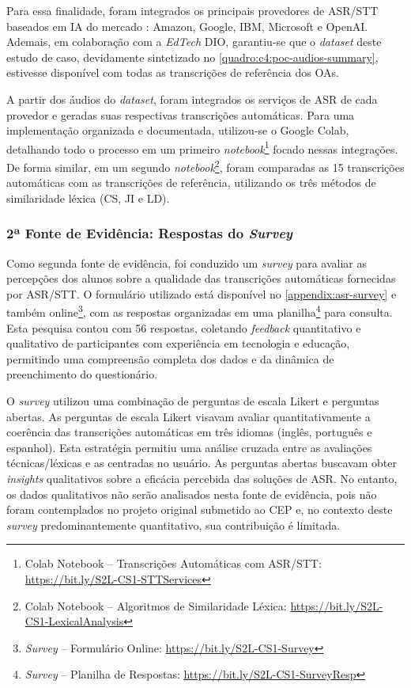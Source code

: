 Para essa finalidade, foram integrados os principais provedores de ASR/STT baseados em IA do mercado \cite{Gartner2023}: Amazon, Google, IBM, Microsoft e OpenAI. Ademais, em colaboração com a \textit{EdTech} DIO, garantiu-se que o \textit{dataset} deste estudo de caso, devidamente sintetizado no \autoref{quadro:c4:poc-audios-summary}, estivesse disponível com todas as transcrições de referência dos OAs.

A partir dos áudios do \textit{dataset}, foram integrados os serviços de ASR de cada provedor e geradas suas respectivas transcrições automáticas. Para uma implementação organizada e documentada, utilizou-se o Google Colab, detalhando todo o processo em um primeiro \textit{notebook}\footnote{Colab Notebook -- Transcrições Automáticas com ASR/STT: \url{https://bit.ly/S2L-CS1-STTServices}} focado nessas integrações. De forma similar, em um segundo \textit{notebook}\footnote{Colab Notebook -- Algoritmos de Similaridade Léxica: \url{https://bit.ly/S2L-CS1-LexicalAnalysis}}, foram comparadas as 15 transcrições automáticas com as transcrições de referência, utilizando os três métodos de similaridade léxica (CS, JI e LD).

\subsubsection{2ª Fonte de Evidência: Respostas do \textit{Survey}}

Como segunda fonte de evidência, foi conduzido um \textit{survey} para avaliar as percepções dos alunos sobre a qualidade das transcrições automáticas fornecidas por ASR/STT. O formulário utilizado está disponível no \autoref{appendix:asr-survey} e também online\footnote{\textit{Survey} -- Formulário Online: \url{https://bit.ly/S2L-CS1-Survey}}, com as respostas organizadas em uma planilha\footnote{\textit{Survey} -- Planilha de Respostas: \url{https://bit.ly/S2L-CS1-SurveyResp}} para consulta. Esta pesquisa contou com 56 respostas, coletando \textit{feedback} quantitativo e qualitativo de participantes com experiência em tecnologia e educação, permitindo uma compreensão completa dos dados e da dinâmica de preenchimento do questionário.

O \textit{survey} utilizou uma combinação de perguntas de escala Likert e perguntas abertas. As perguntas de escala Likert visavam avaliar quantitativamente a coerência das transcrições automáticas em três idiomas (inglês, português e espanhol). Esta estratégia permitiu uma análise cruzada entre as avaliações técnicas/léxicas e as centradas no usuário. As perguntas abertas buscavam obter \textit{insights} qualitativos sobre a eficácia percebida das soluções de ASR. No entanto, os dados qualitativos não serão analisados nesta fonte de evidência, pois não foram contemplados no projeto original submetido ao CEP e, no contexto deste \textit{survey} predominantemente quantitativo, sua contribuição é limitada.

